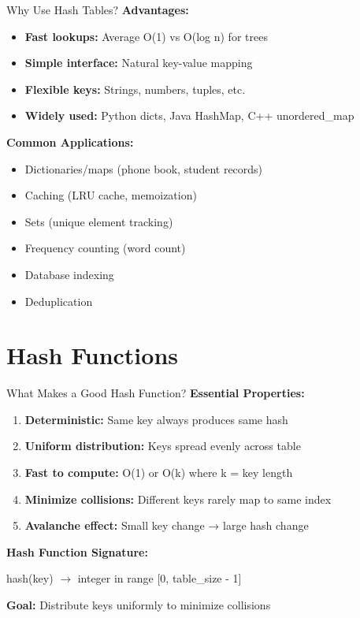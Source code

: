 \documentclass[aspectratio=169]{beamer}
\begin{document}
\begin{frame}{Why Use Hash Tables?}
  \textbf{Advantages:}
  \begin{itemize}
    \item \textbf{Fast lookups:} Average O(1) vs O(log n) for trees
    \item \textbf{Simple interface:} Natural key-value mapping
    \item \textbf{Flexible keys:} Strings, numbers, tuples, etc.
    \item \textbf{Widely used:} Python dicts, Java HashMap, C++ unordered\_map
  \end{itemize}

  \vspace{0.3cm}
  \textbf{Common Applications:}
  \begin{itemize}
    \item Dictionaries/maps (phone book, student records)
    \item Caching (LRU cache, memoization)
    \item Sets (unique element tracking)
    \item Frequency counting (word count)
    \item Database indexing
    \item Deduplication
  \end{itemize}
\end{frame}

\section{Hash Functions}

\begin{frame}{What Makes a Good Hash Function?}
  \textbf{Essential Properties:}
  \begin{enumerate}
    \item \textbf{Deterministic:} Same key always produces same hash
    \item \textbf{Uniform distribution:} Keys spread evenly across table
    \item \textbf{Fast to compute:} O(1) or O(k) where k = key length
    \item \textbf{Minimize collisions:} Different keys rarely map to same index
    \item \textbf{Avalanche effect:} Small key change → large hash change
  \end{enumerate}

  \vspace{0.3cm}
  \textbf{Hash Function Signature:}
  \begin{center}
    hash(key) $\rightarrow$ integer in range [0, table\_size - 1]
  \end{center}

  \vspace{0.3cm}
  \textbf{Goal:} Distribute keys uniformly to minimize collisions
\end{frame}
\end{document}
